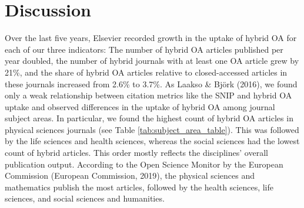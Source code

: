 \documentclass[a4paper,man,floatsintext,longtable,noextraspace,12pt]{apa6}
\begin{document}
\hypertarget{discussion}{%
\section{Discussion}\label{discussion}}

Over the last five years, Elsevier recorded growth in the uptake of
hybrid OA for each of our three indicators: The number of hybrid OA
articles published per year doubled, the number of hybrid journals with
at least one OA article grew by 21\%, and the share of hybrid OA
articles relative to closed-accessed articles in these journals
increased from 2.6\% to 3.7\%. As Laakso \& Björk (2016), we found only
a weak relationship between citation metrics like the SNIP and hybrid OA
uptake and observed differences in the uptake of hybrid OA among journal
subject areas. In particular, we found the highest count of hybrid OA
articles in physical sciences journals (see Table
\ref{tab:subject_area_table}). This was followed by the life sciences
and health sciences, whereas the social sciences had the lowest count of
hybrid articles. This order mostly reflects the disciplines' overall
publication output. According to the Open Science Monitor by the
European Commission (European Commission, 2019), the physical sciences
and mathematics publish the most articles, followed by the health
sciences, life sciences, and social sciences and humanities.
\end{document}

